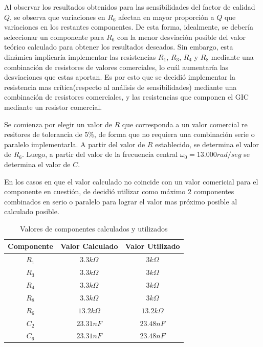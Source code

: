 Al observar los resultados obtenidos para las sensibilidades del factor de calidad $Q$, se observa que variaciones en $R_6$ afectan en mayor proporción a $Q$ que variaciones en los restantes componentes. De esta forma, idealmente, se debería seleccionar un componente para $R_6$ con la menor desviación posible del valor teórico calculado para obtener los resultados deseados. Sin embargo, esta dinámica implicaría implementar las resistencias $R_1$, $R_3$, $R_4$ y $R_8$ mediante una combinación de resistores de valores comerciales,  lo cuál aumentaría las desviaciones que estas aportan. Es por esto que se decidió implementar la resistencia mas crítica(respecto al análisis de sensibilidades) mediante una combinación de resistores comerciales, y las resistencias que componen el GIC mediante un resistor comercial.

Se comienza por elegir un valor de $R$ que corresponda a un valor comercial re resitores de tolerancia de $5\%$, de forma que no requiera una combinación serie o paralelo implementarla. A partir del valor de $R$ establecido, se determina el valor de $R_6$. Luego, a partir del valor de la frecuencia central $\omega_0=13.000 rad/seg $ se determina el valor de $C$.

En los casos en que el valor calculado no coincide con un valor comericial para el componente en cuestión, de decidió utilizar como máximo 2 componentes combinados en serio o paralelo para lograr el valor mas próximo posible al calculado posible.
\smallskip

\begin{table}[h]
\centering
\begin{tabular}{|c|c|c|}
\hline 
Componente & Valor Calculado & Valor Utilizado \\ 
\hline 
$R_1$ & $3.3k\Omega$ & $3k\Omega$ \\ 
\hline 
$R_3$ & $3.3k\Omega$ & $3k\Omega$ \\
\hline 
$R_4$ & $3.3k\Omega$ & $3k\Omega$ \\ 
\hline 
$R_8$ & $3.3k\Omega$ & $3k\Omega$ \\ 
\hline 
$R_6$ & $13.2k\Omega$ & $13.2k\Omega$ \\
\hline 
$C_2$ & $23.31nF$ & $23.48nF$ \\
\hline 
$C_6$ & $23.31nF$ & $23.48nF$ \\
\hline 
\end{tabular} 
\caption{Valores de componentes calculados y utilizados}
\end{table}

